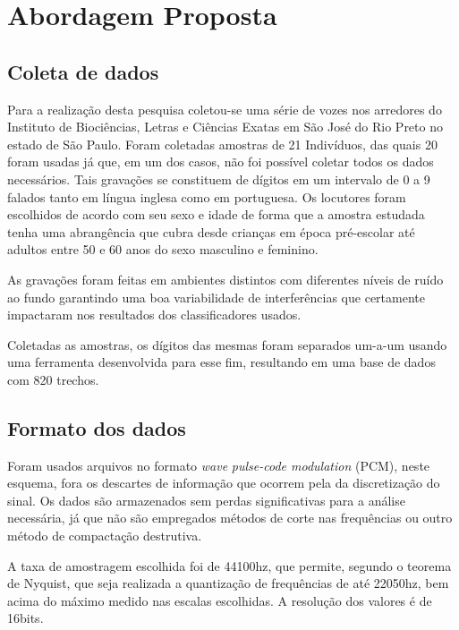 \chapter{Abordagem Proposta} \label{chap:propApproach}
	\section{Coleta de dados}
		\par Para a realização desta pesquisa coletou-se uma série de vozes nos arredores do Instituto de Biociências, Letras e Ciências Exatas em São José do Rio Preto no estado de São Paulo. Foram coletadas amostras de 21 Indivíduos, das quais 20 foram usadas já que, em um dos casos, não foi possível coletar todos os dados necessários. Tais gravações se constituem de dígitos em um intervalo de 0 a 9 falados tanto em língua inglesa como em portuguesa. Os locutores foram escolhidos de acordo com seu sexo e idade de forma que a amostra estudada tenha uma abrangência que cubra desde crianças em época pré-escolar até adultos entre 50 e 60 anos do sexo masculino e feminino.
					
		\par As gravações foram feitas em ambientes distintos com diferentes níveis de ruído ao fundo garantindo uma boa variabilidade de interferências que certamente impactaram nos resultados dos classificadores usados.
		
		\par Coletadas as amostras, os dígitos das mesmas foram separados um-a-um usando uma ferramenta desenvolvida para esse fim, resultando em uma base de dados com 820 trechos.
		
	\section{Formato dos dados}
		\par Foram usados arquivos no formato \textit{wave} \textit{pulse-code modulation} (PCM), neste esquema, fora os descartes de informação que ocorrem pela da discretização do sinal. Os dados são armazenados sem perdas significativas para a análise necessária, já que não são empregados métodos de corte nas frequências ou outro método de compactação destrutiva.
		
		\par A taxa de amostragem escolhida foi de 44100hz, que permite, segundo o teorema de Nyquist, que seja realizada a quantização de frequências de até 22050hz, bem acima do máximo medido nas escalas escolhidas. A resolução dos valores é de 16bits.
		
